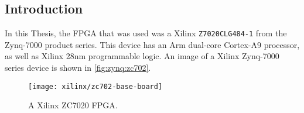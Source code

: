 \subsection{Introduction}
\label{zynq:introduction}
\nocite{Zynq7000:ProductBrief,Zynq7000:UserGuide}
In this Thesis, the \gls{FPGA} that was used was a
Xilinx\textsuperscript{\textregistered} \verb+Z7020CLG484-1+ from the Zynq-7000
product series. This device has an Arm\textsuperscript{\textregistered}
dual-core Cortex\textsuperscript{\texttrademark}-A9 processor, as well as
Xilinx 28nm programmable logic. An image of a
Xilinx\textsuperscript{\textregistered} Zynq-7000 series device is shown in
\autoref{fig:zynq:zc702}.

\begin{figure}
    \centering
    \texttt{[image: xilinx/zc702-base-board]}
    \caption{A Xilinx ZC7020 \gls{FPGA}.}
    \label{fig:zynq:zc702}
\end{figure}

